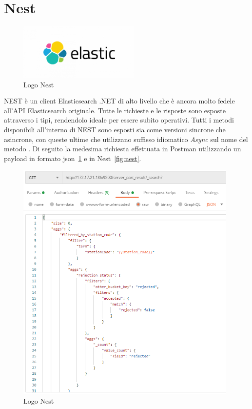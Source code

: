 \section{Nest}
\begin{figure}[ht!]
\begin{center}
  \includegraphics[width=6cm]{images/elastic.png}
  \caption{Logo Nest}
\end{center}
\end{figure}
NEST è un client Elasticsearch .NET di alto livello che è ancora molto fedele all'API Elasticsearch originale. Tutte le richieste e le risposte sono esposte attraverso i tipi, rendendolo ideale per essere subito operativi.
Tutti i metodi disponibili all'interno di NEST sono esposti sia come versioni sincrone che asincrone, con queste ultime che utilizzano suffisso idiomatico \textit{Async} sul nome del metodo \cite{Nest}.
Di seguito la medesima richiesta effettuata in Postman utilizzando un payload in formato json~\ref{fig:json} e in Nest~\ref{fig:nest}.
\pagebreak
\begin{figure}[ht!]
\begin{center}
  \includegraphics[width=11cm]{images/json.png}
  \caption{Logo Nest}
  \label{fig:json}
\end{center}
\end{figure}
